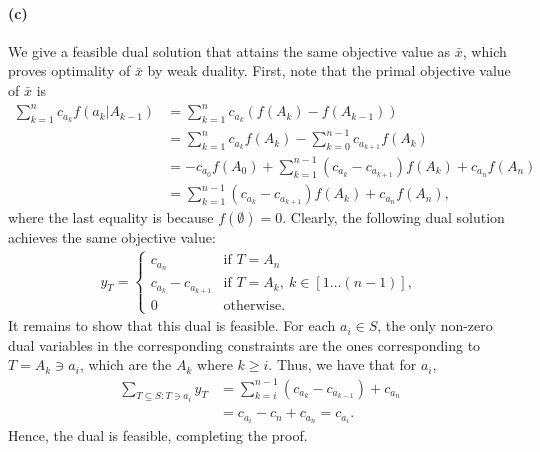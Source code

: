 \documentclass[11pt,letterpaper]{article}
\theoremstyle{definition}
\begin{document}
\paragraph{(c)}
We give a feasible dual solution that attains the same objective value as $\bar{x}$, which proves optimality of $\bar{x}$ by weak duality.
First, note that the primal objective value of $\bar{x}$ is 
\begin{align*}
    \sum_{k=1}^n c_{a_k} f(a_k|A_{k-1}) &= \sum_{k=1}^n c_{a_k} (f(A_{k}) - f(A_{k-1})) \\
    &= \sum_{k=1}^n c_{a_k} f(A_{k}) -  \sum_{k=0}^{n-1}c_{a_{k+1}}f(A_{k}) \\
    &= - c_{a_0}f(A_0)+ \sum_{k=1}^{n-1}(c_{a_k} - c_{a_{k+1}})f(A_k) + c_{a_n} f(A_n)\\
    &=\sum_{k=1}^{n-1}(c_{a_k} - c_{a_{k+1}})f(A_k)  + c_{a_n} f(A_n),
\end{align*}
where the last equality is because $f(\emptyset)=0$. Clearly, the following dual solution achieves the same objective value:
\begin{align*}
    y_T = 
    \begin{cases}
        c_{a_n} &\text{if }T = A_n \\
        c_{a_k} - c_{a_{k+1}} &\text{if }T = A_k, \ k\in [1 \dots (n-1)],\\
        0  &\text{otherwise.}
    \end{cases}
\end{align*}
It remains to show that this dual is feasible. For each $a_i\in S$, the only non-zero dual variables in the corresponding constraints are the ones corresponding to $T=A_k\ni a_i$, which are the $A_k$ where $k\geq i$. 
Thus, we have that for $a_i$,
\begin{align*}
    \sum_{T\subseteq S: T\ni a_i} y_T &= \sum_{k=i}^{n-1} (c_{a_k} - c_{a_{k-1}}) + c_{a_n}\\
    & = c_{a_i} - c_{n} + c_{a_n} = c_{a_i}.
\end{align*}
Hence, the dual is feasible, completing the proof.
\end{document}
